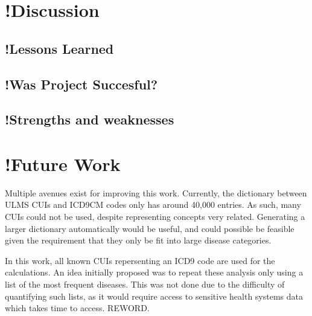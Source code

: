 \documentclass[10pt]{article}
\begin{document}


\section{!Discussion}
\subsection{!Lessons Learned}
\subsection{!Was Project Succesful?}
\subsection{!Strengths and weaknesses}

\section{!Future Work}
Multiple avenues exist for improving this work. Currently, the dictionary between ULMS CUIs and ICD9CM codes only has around 40,000 entries. As such, many CUIs could not be used, despite representing concepts very related. Generating a larger dictionary automatically would be useful, and could possible be feasible given the requirement that they only be fit into large disease categories. 

In this work, all known CUIs repersenting an ICD9 code are used for the calculations. An idea initially proposed was to repeat these analysis only using a list of the most frequent diseases. This was not done due to the difficulty of quantifying such lists, as it would require access to sensitive health systems data which takes time to access. REWORD. 
\end{document}
